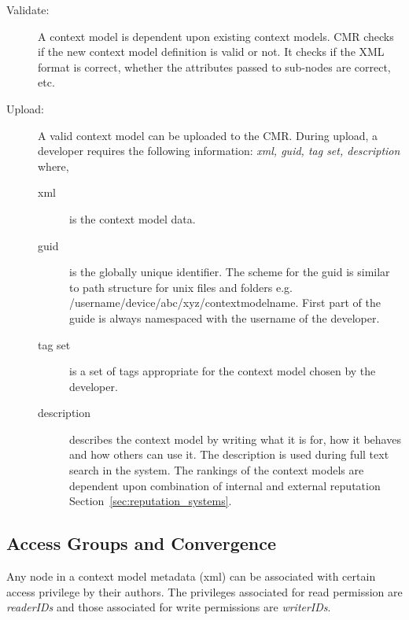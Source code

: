 \begin{description}
  \item[Validate:] A context model is dependent upon existing context models. CMR checks if the new context model definition is valid or not. It checks if the XML format is correct, whether the attributes passed to sub-nodes are correct, etc.
  \item[Upload:] A valid context model can be uploaded to the CMR. During upload, a developer requires the following information: \emph{xml, guid, tag set, description} where,

\begin{description}
  \item[xml] is the context model data.
  \item[guid] is the globally unique identifier. The scheme for the guid is similar to path structure for unix files and folders e.g. /username/device/abc/xyz/contextmodelname. First part of the guide is always namespaced with the username of the developer.
  \item[tag set] is a set of tags appropriate for the context model chosen by the developer.
  \item[description] describes the context model by writing what it is for, how it behaves and how others can use it. The description is used during full text search in the system. The rankings of the context models are dependent upon combination of internal and external reputation Section~\ref{sec:reputation_systems}.
\end{description}

\end{description}


\subsection{Access Groups and Convergence}
\label{subsec:access_groups_and_convergence}

Any node in a context model metadata (xml) can be associated with certain access privilege by their authors. The privileges associated for read permission are \emph{readerIDs} and those associated for write permissions are \emph{writerIDs}.

